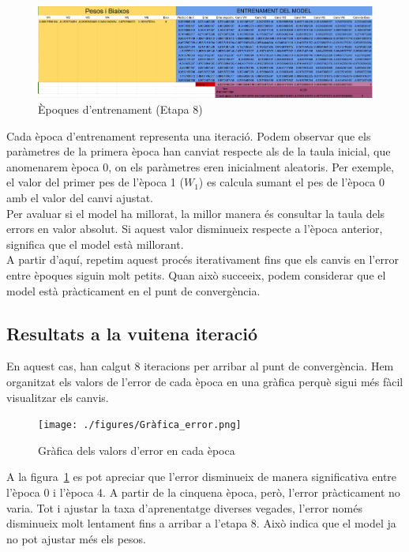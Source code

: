 \begin{figure}[H]
    \centering
    \includegraphics[width=1\textwidth]{./figures/Etapa8.png}
    \caption{Èpoques d'entrenament (Etapa 8)}
\end{figure}

Cada època d’entrenament representa una iteració. Podem observar que els paràmetres de la primera època han canviat respecte als de la taula inicial, que anomenarem època 0, on els paràmetres eren inicialment aleatoris. Per exemple, el valor del primer pes de l’època 1 ($W_1$) es calcula sumant el pes de l’època 0 amb el valor del canvi ajustat.\\

Per avaluar si el model ha millorat, la millor manera és consultar la taula dels errors en valor absolut. Si aquest valor disminueix respecte a l’època anterior, significa que el model està millorant.\\

A partir d’aquí, repetim aquest procés iterativament fins que els canvis en l’error entre èpoques siguin molt petits. Quan això succeeix, podem considerar que el model està pràcticament en el punt de convergència.%
\subsection{Resultats a la vuitena iteració}
En aquest cas, han calgut 8 iteracions per arribar al punt de convergència. Hem organitzat els valors de l'error de cada època en una gràfica perquè sigui més fàcil visualitzar els canvis.

\begin{figure}[h!]
    \centering
    \texttt{[image: ./figures/Gràfica\_error.png]}
    \caption{Gràfica dels valors d'error en cada època}
    \label{f:errorsEpoca}
\end{figure}

A la figura~\ref{f:errorsEpoca} es pot apreciar que l’error disminueix de manera significativa entre l’època 0 i l’època 4. A partir de la cinquena època, però, l’error pràcticament no varia. Tot i ajustar la taxa d’aprenentatge diverses vegades, l’error només disminueix molt lentament fins a arribar a l’etapa 8. Això indica que el model ja no pot ajustar més els pesos.

